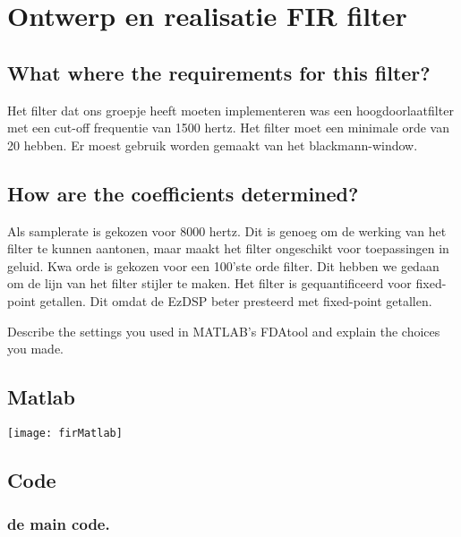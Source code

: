 \section{Ontwerp en realisatie FIR filter}

\subsection{What where the requirements for this filter?}
Het filter dat ons groepje heeft moeten implementeren was een hoogdoorlaatfilter met een cut-off frequentie van 1500 hertz. 
Het filter moet een minimale orde van 20 hebben. Er moest gebruik worden gemaakt van het blackmann-window.

\subsection{How are the coefficients determined?}
Als samplerate is gekozen voor 8000 hertz. Dit is genoeg om de werking van het filter te kunnen aantonen, maar maakt het filter ongeschikt voor toepassingen in geluid. 
Kwa orde is gekozen voor een 100'ste orde filter. Dit hebben we gedaan om de lijn van het filter stijler te maken.
Het filter is gequantificeerd voor fixed-point getallen. Dit omdat de EzDSP beter presteerd met fixed-point getallen.


    \begin{enumerate}[label=\emph{\alph*)}]
         Describe the settings you 					used in MATLAB’s FDAtool and explain the 					choices you made.
    \end{enumerate}


    \subsection{Matlab}
    
    \texttt{[image: firMatlab]}\par\vspace{1cm}
    \clearpage
    \subsection{Code}

    \subsubsection{de main code.}
        

